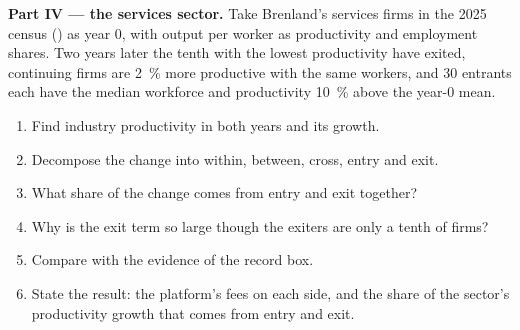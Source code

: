 \begin{problem}
\medskip\noindent\textbf{Part IV --- the services sector.} Take Brenland's services firms
in the 2025 census () as year 0, with output per worker as productivity and
employment shares. Two years later the tenth with the lowest productivity have
exited, continuing firms are 2~\% more productive with the same workers, and 30 entrants
each have the median workforce and productivity 10~\% above the year-0 mean.
\begin{enumerate}[resume]
\item Find industry productivity in both years and its growth.
\item Decompose the change into within, between, cross, entry and exit.
\item What share of the change comes from entry and exit together?
\item Why is the exit term so large though the exiters are only a tenth of firms?
\item Compare with the evidence of the record box.
\item State the result: the platform's fees on each side, and the share of the
sector's productivity growth that comes from entry and exit.
\end{enumerate}
\end{problem}
